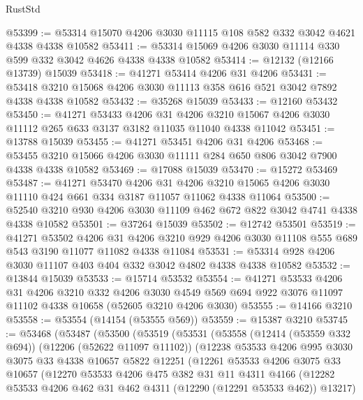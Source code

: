 \begin{lexlean}{RustStd}
\begin{coremodule}
{\begin{coremodule}
{{{{{{{{{{{{{{{{{{{{{{{{{{{{{{{{{{{{{{{{{{{{{{{{{{@53399 := @53314 @15070 @4206 @3030 @11115 @108 @582 @332 @3042 @4621 @4338 @4338 @10582
@53411 := @53314 @15069 @4206 @3030 @11114 @330 @599 @332 @3042 @4626 @4338 @4338 @10582
@53414 := @12132 (@12166 @13739) @15039
@53418 := @41271 @53414 @4206 @31 @4206
@53431 := @53418 @3210 @15068 @4206 @3030 @11113 @358 @616 @521 @3042 @7892 @4338 @4338 @10582
@53432 := @35268 @15039
@53433 := @12160 @53432
@53450 := @41271
    @53433
    @4206
    @31
    @4206
    @3210
    @15067
    @4206
    @3030
    @11112
    @265
    @633
    @3137
    @3182
    @11035
    @11040
    @4338
    @11042
@53451 := @13788 @15039
@53455 := @41271 @53451 @4206 @31 @4206
@53468 := @53455 @3210 @15066 @4206 @3030 @11111 @284 @650 @806 @3042 @7900 @4338 @4338 @10582
@53469 := @17088 @15039
@53470 := @15272 @53469
@53487 := @41271
    @53470
    @4206
    @31
    @4206
    @3210
    @15065
    @4206
    @3030
    @11110
    @424
    @661
    @334
    @3187
    @11057
    @11062
    @4338
    @11064
@53500 := @52540 @3210 @930 @4206 @3030 @11109 @462 @672 @822 @3042 @4741 @4338 @4338 @10582
@53501 := @37264 @15039
@53502 := @12742 @53501
@53519 := @41271
    @53502
    @4206
    @31
    @4206
    @3210
    @929
    @4206
    @3030
    @11108
    @555
    @689
    @543
    @3190
    @11077
    @11082
    @4338
    @11084
@53531 := @53314 @928 @4206 @3030 @11107 @403 @404 @332 @3042 @4802 @4338 @4338 @10582
@53532 := @13844 @15039
@53533 := @15714 @53532
@53554 := @41271
    @53533
    @4206
    @31
    @4206
    @3210
    @332
    @4206
    @3030
    @4549
    @569
    @694
    @922
    @3076
    @11097
    @11102
    @4338
    @10658
    (@52605 @3210 @4206 @3030)
@53555 := @14166 @3210
@53558 := @53554 (@14154 (@53555 @569))
@53559 := @15387 @3210
@53745 := @53468
    (@53487
      (@53500
        (@53519
          (@53531
            (@53558
              (@12414 (@53559 @332 @694))
              (@12206 (@52622 @11097 @11102))
              (@12238
                @53533
                @4206
                @995
                @3030
                @3075
                @33
                @4338
                @10657
                @5822
                @12251
                (@12261
                  @53533
                  @4206
                  @3075
                  @33
                  @10657
                  (@12270
                    @53533
                    @4206
                    @475
                    @382
                    @31
                    @11
                    @4311
                    @4166
                    (@12282 @53533 @4206 @462 @31 @462 @4311 (@12290 (@12291 @53533 @462)) @13217)
}}}}}}}}}}}}}}}}}}}}}}}}}}}}}}}}}}}}}}}}}}}}}}}}}}
\end{coremodule}}
\end{coremodule}
\end{lexlean}
